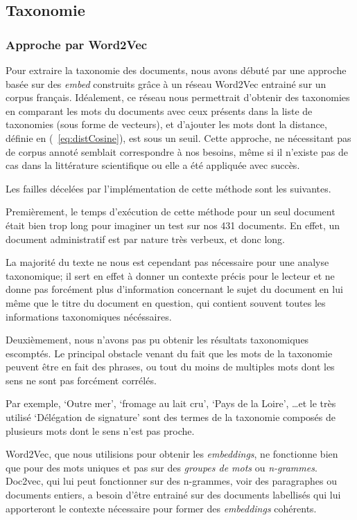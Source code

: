 \subsection{Taxonomie}%
\subsubsection{Approche par Word2Vec\label{word2vecReal}}
Pour extraire la taxonomie des documents, nous avons débuté par une approche basée sur des \textit{\gls{embed}} construits grâce à un réseau Word2Vec entrainé sur un corpus français.
Idéalement, ce réseau nous permettrait d'obtenir des taxonomies en comparant les mots du documents avec ceux présents dans la liste de taxonomies (sous forme de vecteurs), et d'ajouter les mots dont la distance, définie en (~\ref{eq:distCosine}), est sous un seuil.
Cette approche, ne nécessitant pas de corpus annoté semblait correspondre à nos besoins, même si il n'existe pas de cas dans la littérature scientifique ou elle a été appliquée avec succès. %


Les failles décelées par l'implémentation de cette méthode sont les suivantes.

Premièrement, le temps d'exécution de cette méthode pour un seul document était bien trop long pour imaginer un test sur nos 431 documents.
En effet, un document administratif est par nature très verbeux, et donc long.

La majorité du texte ne nous est cependant pas nécessaire pour une analyse taxonomique; 
il sert en effet à donner un contexte précis pour le lecteur et ne donne pas forcément plus d'information concernant le sujet du document en lui même que le titre du document en question, qui contient souvent toutes les informations taxonomiques nécéssaires. 


Deuxièmement, nous n'avons pas pu obtenir les résultats taxonomiques escomptés.
Le principal obstacle venant du fait que les mots de la taxonomie peuvent être en fait des phrases, ou tout du moins de multiples mots dont les sens ne sont pas forcément corrélés.

Par exemple, `Outre mer', `fromage au lait cru', `Pays de la Loire', \ldots et le très utilisé `Délégation de signature' sont des termes de la taxonomie composés de plusieurs mots dont le sens n'est pas proche.

Word2Vec, que nous utilisions pour obtenir les \textit{embeddings}, ne fonctionne bien que pour des mots uniques et pas sur des \textit{groupes de mots} ou \textit{n-grammes}.
Doc2vec, qui lui peut fonctionner sur des n-grammes, voir des paragraphes ou documents entiers, a besoin d'être entrainé sur des documents labellisés qui lui apporteront le contexte nécessaire pour former des \textit{embeddings} cohérents.


